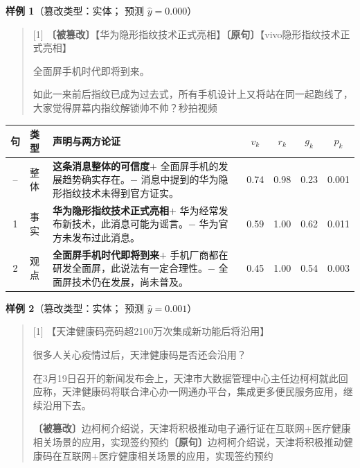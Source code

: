 \noindent\textbf{样例 1}（篡改类型：实体；\method{} 预测 $\hat y=0.000$）\par
{\small\begin{quote}
[1] \textbf{〔被篡改〕}【华为隐形指纹技术正式亮相】\quad\textbf{〔原句〕}【vivo隐形指纹技术正式亮相】\par
[2] 全面屏手机时代即将到来。\par
[3] 如此一来前后指纹已成为过去式，所有手机设计上又将站在同一起跑线了，大家觉得屏幕内指纹解锁帅不帅？秒拍视频\par
\end{quote}}
{\small\begin{tabularx}{\linewidth}{@{}clXcccc@{}}
\toprule
句 & 类型 & 声明与两方论证 & $v_k$ & $r_k$ & $g_k$ & $p_k$ \\
\midrule
-- & 整体 & \textbf{这条消息整体的可信度}\newline $+$ 全面屏手机的发展趋势确实存在。\newline $-$ 消息中提到的华为隐形指纹技术未得到官方证实。 & 0.74 & 0.98 & 0.23 & 0.001 \\
1 & 事实 & \textbf{华为隐形指纹技术正式亮相}\newline $+$ 华为经常发布新技术，此消息可能为谣言。\newline $-$ 华为官方未发布过此消息。 & 0.59 & 1.00 & 0.62 & 0.011 \\
2 & 观点 & \textbf{全面屏手机时代即将到来}\newline $+$ 手机厂商都在研发全面屏，此说法有一定合理性。\newline $-$ 全面屏技术仍在发展，尚未普及。 & 0.45 & 1.00 & 0.54 & 0.003 \\
\bottomrule
\end{tabularx}}
\par\medskip
\noindent\textbf{样例 2}（篡改类型：实体；\method{} 预测 $\hat y=0.001$）\par
{\small\begin{quote}
[1] 【天津健康码亮码超2100万次集成新功能后将沿用】\par
[2] 很多人关心疫情过后，天津健康码是否还会沿用？\par
[3] 在3月19日召开的新闻发布会上，天津市大数据管理中心主任边柯柯就此回应称，天津健康码将联合津心办一网通办平台，集成更多便民服务应用，继续沿用下去。\par
[4] \textbf{〔被篡改〕}边柯柯介绍说，天津将积极推动电子通行证在互联网+医疗健康相关场景的应用，实现签约预约\quad\textbf{〔原句〕}边柯柯介绍说，天津将积极推动健康码在互联网+医疗健康相关场景的应用，实现签约预约\par
\end{quote}}
